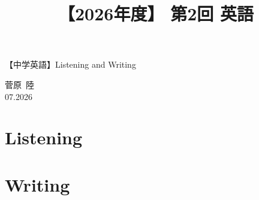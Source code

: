 \documentclass[12pt,a4paper]{jsarticle}
\title{【2026年度】 第2回 英語}                %
\author{}                     %
\date{}                       %
\begin{document}
\begin{center}
{\LARGE 【中学英語】Listening and Writing}
\end{center}

\vspace{5mm}
\begin{flushright}
  菅原\ 陸\\[1.2em]
  07.2026
\end{flushright}


\section{Listening}



\section{Writing}


\end{document}
